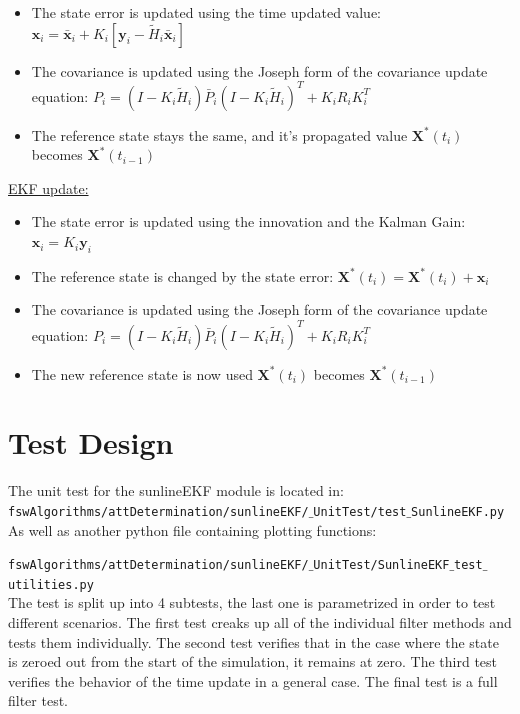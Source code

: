 \documentclass[]{BasiliskReportMemo}
\begin{document}
\begin{itemize}
\item The state error is updated using the time updated value: $\bm x_i =  \bm \bar{x}_i + K_i\left[\bm y_i - \tilde{H}_i \bm \bar{x}_i \right]$
\item The covariance is updated using the Joseph form of the covariance update equation:
$P_i = \left( I - K_i \tilde{H}_i\right) \bar{P}_{i} \left( I - K_i \tilde{H}_i\right)^T + K_i R_i K_i^T$
\item The reference state stays the same, and it's propagated value $\bm X^*(t_i)$ becomes $\bm X^*(t_{i-1})$
\end{itemize}

 \underline{EKF update:}

\begin{itemize}
\item The state error is updated using the innovation and the Kalman Gain: $\bm x_i =   K_i\bm y_i $
\item The reference state is changed by the state error: $\bm X^*(t_i) =  \bm X^*(t_i) + \bm x_i $
\item The covariance is updated using the Joseph form of the covariance update equation:
$P_i = \left( I - K_i \tilde{H}_i\right) \bar{P}_{i} \left( I - K_i \tilde{H}_i\right)^T + K_i R_i K_i^T$
\item The new reference state is now used $\bm X^*(t_i)$ becomes $\bm X^*(t_{i-1})$
\end{itemize}

 


\section{Test Design}
The unit test for the sunlineEKF module is located in:\\

\noindent
{\tt fswAlgorithms/attDetermination/sunlineEKF/$\_$UnitTest/test$\_$SunlineEKF.py} \\

As well as another python file containing plotting functions:

\noindent
{\tt fswAlgorithms/attDetermination/sunlineEKF/$\_$UnitTest/SunlineEKF$\_$test$\_$utilities.py} \\

The test is split up into 4 subtests, the last one is parametrized in order to test different scenarios. The first test creaks up all of the individual filter methods and tests them individually. The second test verifies that in the case where the state is zeroed out from the start of the simulation, it remains at zero. The third test verifies the behavior of the time update in a general case. The final test is a full filter test.
\end{document}
